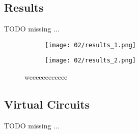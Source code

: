 
\subsection{Results}
    \colorbox{BurntOrange}{TODO missing ...}


    \begin{figure}[H]
        \centering
        \begin{subfigure}[b]{1.0\textwidth}
            \centering 
            \texttt{[image: 02/results\_1.png]}
            \caption{}
            \label{fig:vgpijerbgvpiberq}
        \end{subfigure}
        \begin{subfigure}[b]{1.0\textwidth}
            \centering
            \texttt{[image: 02/results\_2.png]}
            \caption{}
            \label{fig:vjidqenvjqen}
        \end{subfigure}
        \caption{weeeeeeeeeeee}
        \label{fig:vneqpwijvnpjewqnpivnenq}
    \end{figure}

\subsection{Virtual Circuits}
    \colorbox{BurntOrange}{TODO missing ...}
